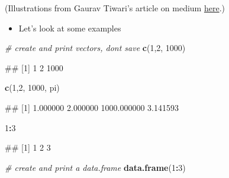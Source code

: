 \documentclass[
]{book}
\newenvironment{Shaded}{\begin{snugshade}}{\end{snugshade}}
\newcommand{\CommentTok}[1]{\textcolor[rgb]{0.56,0.35,0.01}{\textit{#1}}}
\newcommand{\DecValTok}[1]{\textcolor[rgb]{0.00,0.00,0.81}{#1}}
\newcommand{\FunctionTok}[1]{\textcolor[rgb]{0.13,0.29,0.53}{\textbf{#1}}}
\newcommand{\NormalTok}[1]{#1}
\newcommand{\SpecialCharTok}[1]{\textcolor[rgb]{0.81,0.36,0.00}{\textbf{#1}}}
\providecommand{\tightlist}{%
  \setlength{\itemsep}{0pt}\setlength{\parskip}{0pt}}
\begin{document}
(Illustrations from Gaurav Tiwari's article on medium \href{https://medium.com/@tiwarigaurav2512/r-data-types-847fffb01d5b}{here}.)

\begin{itemize}
\tightlist
\item
  Let's look at some examples
\end{itemize}

\begin{Shaded}
\begin{Highlighting}[]
\CommentTok{\# create and print vectors, don\textquotesingle{}t save}
\FunctionTok{c}\NormalTok{(}\DecValTok{1}\NormalTok{,}\DecValTok{2}\NormalTok{, }\DecValTok{1000}\NormalTok{)}
\end{Highlighting}
\end{Shaded}

\begin{Shaded}
\begin{Highlighting}[]
\NormalTok{\#\# [1]    1    2 1000}
\end{Highlighting}
\end{Shaded}

\begin{Shaded}
\begin{Highlighting}[]
\FunctionTok{c}\NormalTok{(}\DecValTok{1}\NormalTok{,}\DecValTok{2}\NormalTok{, }\DecValTok{1000}\NormalTok{, pi)}
\end{Highlighting}
\end{Shaded}

\begin{Shaded}
\begin{Highlighting}[]
\NormalTok{\#\# [1]    1.000000    2.000000 1000.000000    3.141593}
\end{Highlighting}
\end{Shaded}

\begin{Shaded}
\begin{Highlighting}[]
\DecValTok{1}\SpecialCharTok{:}\DecValTok{3}
\end{Highlighting}
\end{Shaded}

\begin{Shaded}
\begin{Highlighting}[]
\NormalTok{\#\# [1] 1 2 3}
\end{Highlighting}
\end{Shaded}

\begin{Shaded}
\begin{Highlighting}[]
\CommentTok{\# create and print a data.frame}
\FunctionTok{data.frame}\NormalTok{(}\DecValTok{1}\SpecialCharTok{:}\DecValTok{3}\NormalTok{)}
\end{Highlighting}
\end{Shaded}
\end{document}
